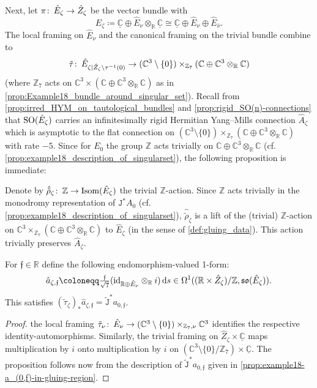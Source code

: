 \documentclass[11pt,a4paper]{scrartcl}
\newcommand*\diff{\mathop{}\!\textup{d}}
\newcommand{\col}{\colon \thinspace}
\newcommand{\id}{\textup{id}}
\newcommand{\SO}{\textup{SO}}
\numberwithin{equation}{section}
\theoremstyle{plain}
\theoremstyle{definition}
\theoremstyle{remark}
\begin{document}
Next, let $\pi \col \hat{E}_\zeta \to \hat{Z}_\zeta$ be the vector bundle with \[\hat{E}_\zeta \coloneqq \underline{\mathbb{C}}\oplus \hat{E}_\nu \otimes_\mathbb{R} \underline{\mathbb{C}} \cong \underline{\mathbb{C}} \oplus \hat{E}_{\nu} \oplus \hat{E}_{\bar{\nu}}.\] The local framing on $\hat{E}_\nu$ and the canonical framing on the trivial bundle combine to \[\tilde{\tau} \col \hat{E}_{\zeta\vert \hat{Z}_\zeta \setminus \tau^{-1}(0)} \to (\mathbb{C}^3\setminus\{0\}) \times_{\mathbb{Z}_7}(\mathbb{C} \oplus \mathbb{C}^3 \otimes_\mathbb{R}\mathbb{C})\] (where $\mathbb{Z}_7$ acts on $\mathbb{C}^3 \times (\mathbb{C} \oplus \mathbb{C}^3 \otimes_\mathbb{R}\mathbb{C})$ as in \autoref{prop:Example18_bundle_around_singular_set}). Recall from \autoref{prop:irred_HYM_on_tautological_bundles} and \autoref{prop:rigid_SO(n)-connections} that $\SO(\hat{E}_\zeta)$ carries an infinitesimally rigid Hermitian Yang--Mills connection $\hat{A}_\zeta$ which is asymptotic to the flat connection on $(\mathbb{C}^3\setminus\{0\}) \times_{\mathbb{Z}_7}(\mathbb{C} \oplus \mathbb{C}^3 \otimes_\mathbb{R}\mathbb{C})$ with rate $-5$. Since for $E_0$ the group $\mathbb{Z}$ acts trivially on $\mathbb{C}\oplus \mathbb{C}^3\otimes_\mathbb{R}\mathbb{C}$ (cf. \autoref{prop:example18_description_of_singularset}), the following proposition is immediate:
\begin{proposition}
Denote by $\hat{\tilde{\rho}}_\zeta \col \mathbb{Z} \to \textup{Isom}(\hat{E}_\zeta)$ the trivial $\mathbb{Z}$-action. Since $\mathbb{Z}$ acts trivially in the monodromy representation of $\mathtt{J}^*A_0$ (cf. \autoref{prop:example18_description_of_singularset}), $\hat{\tilde{\rho}}_\zeta$ is a lift of the (trivial) $\mathbb{Z}$-action on $\mathbb{C}^3\times_{\mathbb{Z}_7}(\mathbb{C}\oplus \mathbb{C}^3\otimes_\mathbb{R}\mathbb{C})$ to $\hat{E}_\zeta$ (in the sense of \autoref{def:gluing_data}). This action trivially preserves $\hat{A}_\zeta$.
\end{proposition}

\begin{proposition}\label{prop:example18-families-over-resolution}
For $\mathfrak{f}\in \mathbb{R}$ define the following endomorphism-valued 1-form: \[ \hat{a}_{\zeta,\mathfrak{f}} \coloneqq \tfrac{\mathfrak{f}}{\sqrt{7}}(\id_{\mathbb{R}\oplus \hat{E}_\nu} \otimes_\mathbb{R} i) \diff s \in \Omega^1((\mathbb{R}\times \hat{Z}_\zeta)/\mathbb{Z},\mathfrak{so}(\hat{E}_\zeta)). \] This satisfies $(\tilde{\tau}_\zeta)_* \hat{a}_{\zeta,\mathfrak{f}} = \tilde{\mathtt{J}}^*a_{0,\mathfrak{f}}$. 
\end{proposition}
\begin{proof}
the local framing $\tilde{\tau}_\nu \col \hat{E}_\nu \to (\mathbb{C}^3\setminus \{0\})\times_{\mathbb{Z}_7,\nu} \mathbb{C}^3$ identifies the respective identity-automorphisms. Similarly, the trivial framing on $\hat{Z}_\zeta \times \underline{\mathbb{C}}$ maps multiplication by $i$ onto multiplication by $i$ on $(\mathbb{C}^3\setminus \{0\}/\mathbb{Z}_7) \times \underline{\mathbb{C}}$. The proposition follows now from the description of $\tilde{\mathtt{J}}^*a_{0,\mathfrak{f}}$ given in \autoref{prop:example18-a_(0,f)-in-gluing-region}.
\end{proof}
\end{document}
